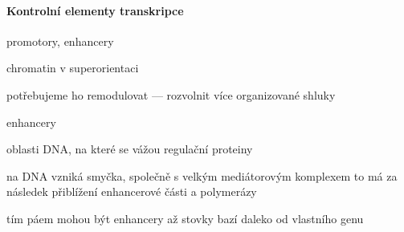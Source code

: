 \documentclass[DIV=8]{scrreprt}
\begin{document}
\paragraph{Kontrolní elementy transkripce}
\begin{myItemize}[nosep]
    \item promotory, enhancery
    \item chromatin v superorientaci
\begin{myItemize}[nosep]
    \item potřebujeme ho remodulovat --- rozvolnit více organizované shluky
\end{myItemize}

    \item enhancery
\begin{myItemize}[nosep]
    \item oblasti DNA, na které se vážou regulační proteiny
    \item na DNA vzniká smyčka, společně s velkým mediátorovým komplexem to má za následek přiblížení enhancerové části a polymerázy
\begin{myItemize}[nosep]
    \item tím páem mohou být enhancery až stovky bazí daleko od vlastního genu
\end{myItemize}

\end{myItemize}

\end{myItemize}
\end{document}
